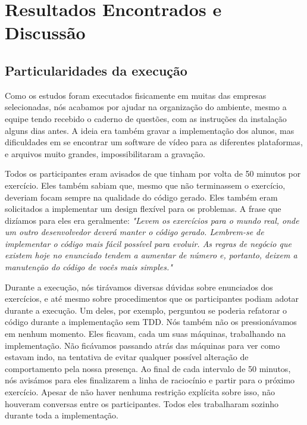 \chapter{Resultados Encontrados e Discussão}
\label{cap:discussao}

\section{Particularidades da execução}

Como os estudos foram executados fisicamente em muitas das empresas selecionadas,
nós acabamos por ajudar na organização do ambiente, mesmo a equipe tendo 
recebido o caderno de questões, com as instruções da instalação
alguns dias antes. A ideia era também gravar a implementação dos alunos,
mas dificuldades em se encontrar um software de vídeo para as diferentes
plataformas, e arquivos muito grandes, impossibilitaram a gravação.

Todos os participantes eram avisados de que tinham por volta de 50 minutos
por exercício. Eles também sabiam que, mesmo que não terminassem o exercício,
deveriam focam sempre na qualidade do código gerado. Eles também eram solicitados
a implementar um design flexível para os problemas. A frase que dizíamos para
eles era geralmente: \textit{"Levem os exercícios para o mundo real, onde um outro
desenvolvedor deverá manter o código gerado. Lembrem-se de implementar o código mais fácil possível
para evoluir. As regras de negócio que existem hoje no enunciado tendem a aumentar
de número e, portanto, deixem a manutenção do código de vocês mais simples."}

Durante a execução, nós tirávamos diversas dúvidas sobre enunciados dos
exercícios, e até mesmo sobre procedimentos que os participantes podiam
adotar durante a execução. Um deles, por exemplo, perguntou se poderia
refatorar o código durante a implementação sem TDD. 
Nós também não os pressionávamos em nenhum momento. Eles ficavam,
cada um suas máquinas, trabalhando na implementação. Não ficávamos 
passando atrás das máquinas para ver como estavam indo, na tentativa
de evitar qualquer possível alteração de comportamento pela nossa presença.
Ao final de cada intervalo de 50 minutos, nós avisámos para eles finalizarem
a linha de raciocínio e partir para o próximo exercício.
Apesar de não haver nenhuma restrição explícita sobre isso, não houveram
conversas entre os participantes. Todos eles trabalharam sozinho
durante toda a implementação.

